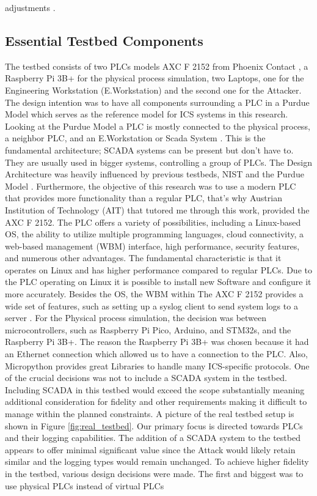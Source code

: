 \documentclass[Master,BMR,english]{twbook}
\begin{document}
adjustments \cite{mitre_attack_chain}\cite{raspberrypi3bplus}. 

\subsection{Essential Testbed Components}

The testbed consists of two PLCs models AXC F 2152  from Phoenix Contact \cite{phoenix_contact_axc_f_2152}, a Raspberry Pi 3B+ \cite{raspberrypi3bplus} for the physical process simulation, two Laptops, one for the Engineering Workstation (E.Workstation) and the second one for the Attacker. The design intention was to have all components surrounding a PLC in a Purdue Model which serves as the reference model for ICS systems in this research. Looking at the Purdue Model a PLC is mostly connected to the physical process, a neighbor PLC, and an E.Workstation or Scada System \cite{cosman_security_nodate}. This is the fundamental architecture; SCADA systems can be present but don’t have to. They are usually used in bigger systems, controlling a group of PLCs. The Design Architecture was heavily influenced by previous testbeds, NIST and the Purdue Model \cite{stouffer_guide_2015}\cite{cosman_security_nodate}\cite{qassim_survey_2017}. Furthermore, the objective of this research was to use a modern PLC that provides more functionality than a regular PLC, that’s why Austrian Institution of Technology (AIT) that tutored me through this work, provided the AXC F 2152. The PLC offers a variety of possibilities, including a Linux-based OS, the ability to utilize multiple programming languages, cloud connectivity, a web-based management (WBM) interface, high performance, security features, and numerous other advantages. The fundamental characteristic is that it operates on Linux and has higher performance compared to regular PLCs. Due to the PLC operating on Linux it is possible to install new Software and configure it more accurately. Besides the OS, the WBM within The AXC F 2152 provides a wide set of features, such as setting up a syslog client to send system logs to a server \cite{phoenix_contact_axc_f_2152}.  For the Physical process simulation, the decision was between microcontrollers, such as Raspberry Pi Pico, Arduino, and STM32s,  and the Raspberry Pi 3B+. The reason the Raspberry Pi 3B+ was chosen because it had an Ethernet connection which allowed us to have a connection to the PLC. Also, Micropython provides great Libraries to handle many ICS-specific protocols. One of the crucial decisions was not to include a SCADA system in the testbed. Including SCADA in this testbed would exceed the scope substantially meaning additional consideration for fidelity and other requirements making it difficult to manage within the planned constraints. A picture of the real testbed setup is shown in Figure \ref{fig:real_testbed}. Our primary focus is directed towards PLCs and their logging capabilities. The addition of a SCADA system to the testbed appears to offer minimal significant value since the Attack would likely retain similar and the logging types would remain unchanged. To achieve higher fidelity in the testbed, various design decisions were made. The first and biggest was to use physical PLCs instead of virtual PLCs 
\end{document}
